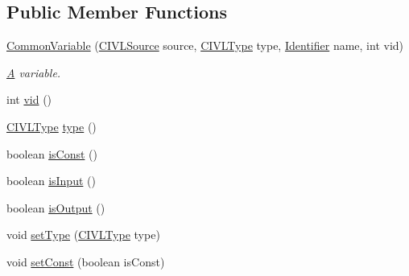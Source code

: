 \subsection*{Public Member Functions}
\begin{DoxyCompactItemize}
\item 
\hyperlink{classedu_1_1udel_1_1cis_1_1vsl_1_1civl_1_1model_1_1common_1_1variable_1_1CommonVariable_addb18c5db0473ad05246988517220bc2}{Common\+Variable} (\hyperlink{interfaceedu_1_1udel_1_1cis_1_1vsl_1_1civl_1_1model_1_1IF_1_1CIVLSource}{C\+I\+V\+L\+Source} source, \hyperlink{interfaceedu_1_1udel_1_1cis_1_1vsl_1_1civl_1_1model_1_1IF_1_1type_1_1CIVLType}{C\+I\+V\+L\+Type} type, \hyperlink{interfaceedu_1_1udel_1_1cis_1_1vsl_1_1civl_1_1model_1_1IF_1_1Identifier}{Identifier} name, int vid)
\begin{DoxyCompactList}\small\item\em \hyperlink{structA}{A} variable. \end{DoxyCompactList}\item 
int \hyperlink{classedu_1_1udel_1_1cis_1_1vsl_1_1civl_1_1model_1_1common_1_1variable_1_1CommonVariable_a86d71f7cc6f3cb2cc1209525f6886591}{vid} ()
\item 
\hyperlink{interfaceedu_1_1udel_1_1cis_1_1vsl_1_1civl_1_1model_1_1IF_1_1type_1_1CIVLType}{C\+I\+V\+L\+Type} \hyperlink{classedu_1_1udel_1_1cis_1_1vsl_1_1civl_1_1model_1_1common_1_1variable_1_1CommonVariable_aa40b454796ea8e92770f9bd42475d71c}{type} ()
\item 
boolean \hyperlink{classedu_1_1udel_1_1cis_1_1vsl_1_1civl_1_1model_1_1common_1_1variable_1_1CommonVariable_a1dc381eb8f6bd01f2abd222612417121}{is\+Const} ()
\item 
boolean \hyperlink{classedu_1_1udel_1_1cis_1_1vsl_1_1civl_1_1model_1_1common_1_1variable_1_1CommonVariable_a7da1368f0aafda8dac8e23bb7c43851b}{is\+Input} ()
\item 
boolean \hyperlink{classedu_1_1udel_1_1cis_1_1vsl_1_1civl_1_1model_1_1common_1_1variable_1_1CommonVariable_a9606dcedbbf15b77ba816470aec07ace}{is\+Output} ()
\item 
void \hyperlink{classedu_1_1udel_1_1cis_1_1vsl_1_1civl_1_1model_1_1common_1_1variable_1_1CommonVariable_a2562e5e3adce8d7a64323425f81a9ba5}{set\+Type} (\hyperlink{interfaceedu_1_1udel_1_1cis_1_1vsl_1_1civl_1_1model_1_1IF_1_1type_1_1CIVLType}{C\+I\+V\+L\+Type} type)
\item 
void \hyperlink{classedu_1_1udel_1_1cis_1_1vsl_1_1civl_1_1model_1_1common_1_1variable_1_1CommonVariable_adbeba35e02bbcd4152ea1f652b39108e}{set\+Const} (boolean is\+Const)

\end{DoxyCompactItemize}
